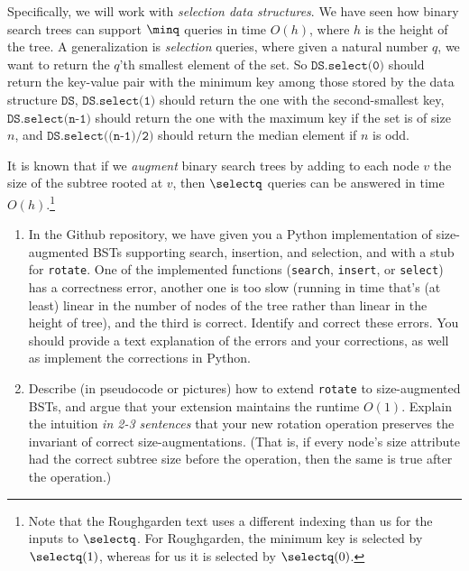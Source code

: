 \documentclass[11pt]{article}
\begin{document}
\begin{enumerate}
    Specifically, we will work with {\em selection data structures}.
    We have seen how binary search trees can support $\minq$ queries in time $O(h)$, where $h$ is the height of the tree.  A generalization is {\em selection} queries, where given a natural number $q$, we want to return the $q$'th smallest element of the set.  So $\texttt{DS.select(0)}$ should return the key-value pair with the minimum key among those stored by the data structure $\texttt{DS}$, $\texttt{DS.select(1)}$ should return the one with the second-smallest key, $\texttt{DS.select(n-1)}$ should return the one with the maximum key if the set is of size $n$, and $\texttt{DS.select((n-1)/2)}$ should return the median element if $n$ is odd.
    
    It is known that if we {\em augment} binary search trees by adding to each node $v$ the size of the subtree rooted at $v$, then $\selectq$ queries can be answered in time $O(h)$.\footnote{Note that the Roughgarden text uses a different indexing than us for the inputs to $\selectq$. For Roughgarden, the minimum key is selected by $\selectq(1)$, whereas for us it is selected by $\selectq(0)$.}

    \begin{enumerate}
        \item In the Github repository, we have given you a Python implementation of size-augmented BSTs supporting search, insertion, and selection, and with a stub for \texttt{rotate}. One of the implemented functions (\texttt{search}, \texttt{insert}, or \texttt{select}) has a correctness error, another one is too slow (running in time that's (at least) linear in the number of nodes of the tree rather than linear in the height of tree), and the third is correct. 
        Identify and correct these errors. You should provide a text explanation of the errors and your corrections, as well as implement the corrections in Python.    

        \item 
        
        Describe (in pseudocode or pictures) how to extend \texttt{rotate} to size-augmented BSTs, and argue that your extension maintains the runtime $O(1)$. Explain the intuition \textit{in 2-3 sentences} that your new rotation operation preserves the invariant of correct size-augmentations. (That is, if every node's size attribute had the correct subtree size before the operation, then the same is true after the operation.)

        \newenvironment{tmpSol}{%
           \setlength{\parindent}{0pt}
           \color{blue}
        }{}


\end{enumerate}
\end{enumerate}
\end{document}
